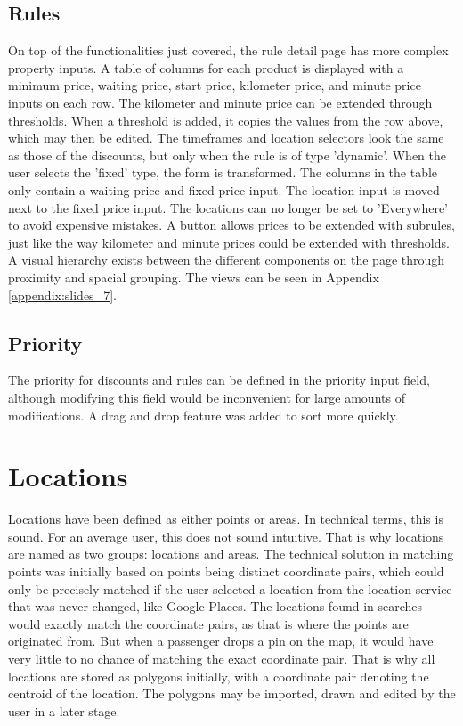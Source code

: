 \subsection{Rules}
On top of the functionalities just covered, the rule detail page has more complex property inputs. A table of columns for each product is displayed with a minimum price, waiting price, start price, kilometer price, and minute price inputs on each row. The kilometer and minute price can be extended through thresholds. When a threshold is added, it copies the values from the row above, which may then be edited. The timeframes and location selectors look the same as those of the discounts, but only when the rule is of type 'dynamic'. When the user selects the 'fixed' type, the form is transformed. The columns in the table only contain a waiting price and fixed price input. The location input is moved next to the fixed price input. The locations can no longer be set to 'Everywhere' to avoid expensive mistakes. A button allows prices to be extended with subrules, just like the way kilometer and minute prices could be extended with thresholds. A visual hierarchy exists between the different components on the page through proximity and spacial grouping. The views can be seen in Appendix \ref{appendix:slides_7}.

\subsection{Priority}
The priority for discounts and rules can be defined in the priority input field, although modifying this field would be inconvenient for large amounts of modifications. A drag and drop feature was added to sort more quickly.

\section{Locations}
Locations have been defined as either points or areas. In technical terms, this is sound. For an average user, this does not sound intuitive. That is why locations are named as two groups: locations and areas. The technical solution in matching points was initially based on points being distinct coordinate pairs, which could only be precisely matched if the user selected a location from the location service that was never changed, like Google Places. The locations found in searches would exactly match the coordinate pairs, as that is where the points are originated from. But when a passenger drops a pin on the map, it would have very little to no chance of matching the exact coordinate pair. That is why all locations are stored as polygons initially, with a coordinate pair denoting the centroid of the location. The polygons may be imported, drawn and edited by the user in a later stage.

